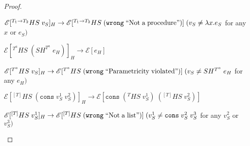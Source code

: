 \begin{hpn}
\begin{proof}
\begin{hpn-case-17}
\end{hpn-case-17}
\begin{hpn-case-18}
$\mathscr{E}[^{T_{1}\rightarrow T_{2}}HS\;v_{S}]_{H}\rightarrow\mathscr{E}[^{T_{1}\rightarrow T_{2}}HS\;(\mathtt{wrong}\;\mathrm{``Not\;a\;procedure"})]\;(v_{S}\neq\lambda x.e_{S}$ for any $x$ or $e_{S})$

\end{hpn-case-18}
\begin{hpn-case-19}
$\mathscr{E}[^{T^{a}}HS\;(SH^{T^{a}}\;e_{H})]_{H}\rightarrow\mathscr{E}[e_{H}]$

\end{hpn-case-19}
\begin{hpn-case-20}
$\mathscr{E}[^{T^{a}}HS\;v_{S}]_{H}\rightarrow\mathscr{E}[^{T^{a}}HS\;(\mathtt{wrong}\;\mathrm{``Parametricity\;violated"})]\;(v_{S}\neq SH^{T^{a}}\;e_{H}$ for any $e_{H})$

\end{hpn-case-20}
\begin{hpn-case-21}
$\mathscr{E}[^{[T]}HS\;(\mathtt{cons}\;v_{S}^{1}\;v_{S}^{2})]_{H}\rightarrow\mathscr{E}[\mathtt{cons}\;(^{T}HS\;v_{S}^{1})\;(^{[T]}HS\;v_{S}^{2})]$

\end{hpn-case-21}
\begin{hpn-case-22}
$\mathscr{E}[^{[T]}HS\;v_{S}^{1}]_{H}\rightarrow\mathscr{E}[^{[T]}HS\;(\mathtt{wrong}\;\mathrm{``Not\;a\;list"})]\;(v_{S}^{1}\neq\mathtt{cons}\;v_{S}^{2}\;v_{S}^{3}$ for any $v_{S}^{2}$ or $v_{S}^{3})$

\end{hpn-case-22}
\end{proof}
\end{hpn}